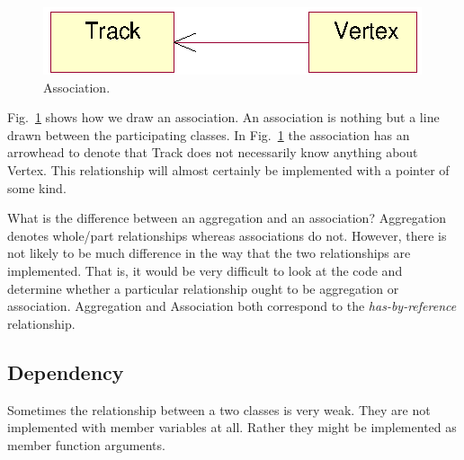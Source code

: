 \documentclass[twoside]{article}
\begin{document}
\begin{figure}[htb]
    \begin{center}
        \includegraphics{umlAssociation.eps}
        \caption{Association.}
        \label{fig:umlAssociation}
    \end{center}
\end{figure}

Fig.~\ref{fig:umlAssociation} shows how we draw an association.  An
association is nothing but a line drawn between the participating
classes. In Fig.~\ref{fig:umlAssociation} the association has an
arrowhead to denote that Track does not necessarily know anything
about Vertex. This relationship will almost certainly be implemented
with a pointer of some kind.

What is the difference between an aggregation and an association?
Aggregation denotes whole/part relationships whereas associations do
not. However, there is not likely to be much difference in the way
that the two relationships are implemented.  That is, it would be very
difficult to look at the code and determine whether a particular
relationship ought to be aggregation or association.  Aggregation and
Association both correspond to the \emph{has-by-reference}
relationship.

\subsection{Dependency}

Sometimes the relationship between a two classes is very weak. They
are not implemented with member variables at all. Rather they might be
implemented as member function arguments.
\end{document}
